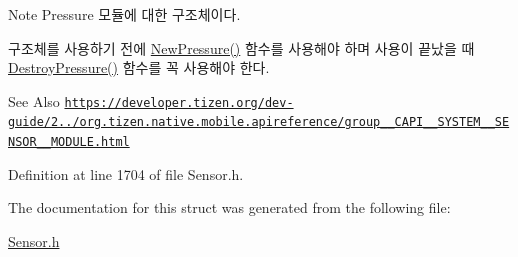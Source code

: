 \begin{DoxyNote}{Note}
Pressure 모듈에 대한 구조체이다. \par
 구조체를 사용하기 전에 \hyperlink{Sensor_8h_ae9affb62208c3fa0cd182163c2447cb0}{New\-Pressure()} 함수를 사용해야 하며 사용이 끝났을 때 \hyperlink{Sensor_8h_af30fd514c8a87224bc535116633bbba3}{Destroy\-Pressure()} 함수를 꼭 사용해야 한다. 
\end{DoxyNote}
\begin{DoxySeeAlso}{See Also}
\href{https://developer.tizen.org/dev-guide/2.3.0/org.tizen.native.mobile.apireference/group__CAPI__SYSTEM__SENSOR__MODULE.html}{\tt https\-://developer.\-tizen.\-org/dev-\/guide/2../org.\-tizen.\-native.\-mobile.\-apireference/group\-\_\-\-\_\-\-C\-A\-P\-I\-\_\-\-\_\-\-S\-Y\-S\-T\-E\-M\-\_\-\-\_\-\-S\-E\-N\-S\-O\-R\-\_\-\-\_\-\-M\-O\-D\-U\-L\-E.\-html} 
\end{DoxySeeAlso}


Definition at line 1704 of file Sensor.\-h.



The documentation for this struct was generated from the following file\-:\begin{DoxyCompactItemize}
\item 
\hyperlink{Sensor_8h}{Sensor.\-h}\end{DoxyCompactItemize}
